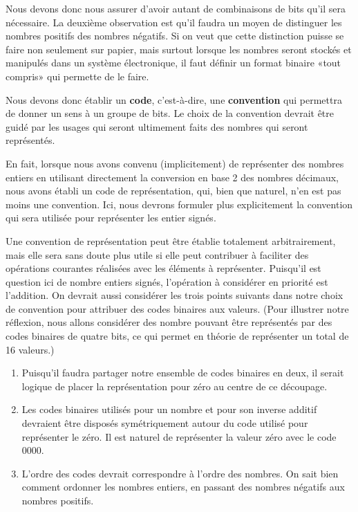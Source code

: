 \documentclass[11pt]{article}
\begin{document}
Nous devons donc nous assurer d'avoir autant de combinaisons de bits
qu'il sera nécessaire. La deuxième observation est qu'il faudra un
moyen de distinguer les nombres positifs des nombres négatifs. Si on
veut que cette distinction puisse se faire non seulement sur papier,
mais surtout lorsque les nombres seront stockés et manipulés dans un
système électronique, il faut définir un format binaire «tout compris»
qui permette de le faire.

Nous devons donc établir un \textbf{code}, c'est-à-dire, une \textbf{convention} qui
permettra de donner un sens à un groupe de bits. Le choix de la
convention devrait être guidé par les usages qui seront ultimement
faits des nombres qui seront représentés.

En fait, lorsque nous avons convenu (implicitement) de représenter des
nombres entiers en utilisant directement la conversion en base 2 des
nombres décimaux, nous avons établi un code de représentation, qui,
bien que naturel, n'en est pas moins une convention. Ici, nous devrons
formuler plus explicitement la convention qui sera utilisée pour
représenter les entier signés.

Une convention de représentation peut être établie totalement
arbitrairement, mais elle sera sans doute plus utile si elle peut
contribuer à faciliter des opérations courantes réalisées avec les
éléments à représenter. Puisqu'il est question ici de nombre entiers
signés, l'opération à considérer en priorité est l'addition. On
devrait aussi considérer les trois points suivants dans notre choix de
convention pour attribuer des codes binaires aux valeurs. (Pour
illustrer notre réflexion, nous allons considérer des nombre pouvant
être représentés par des codes binaires de quatre bits, ce qui permet
en théorie de représenter un total de 16 valeurs.)

\begin{enumerate}
\item Puisqu'il faudra partager notre ensemble de codes binaires en deux,
il serait logique de placer la représentation pour zéro au centre
de ce découpage.

\item Les codes binaires utilisés pour un nombre et pour son inverse
additif devraient être disposés symétriquement autour du code
utilisé pour représenter le zéro. Il est naturel de représenter la
valeur zéro avec le code 0000.

\item L'ordre des codes devrait correspondre à l'ordre des nombres. On
sait bien comment ordonner les nombres entiers, en passant des
nombres négatifs aux nombres positifs.
\end{enumerate}
\end{document}
